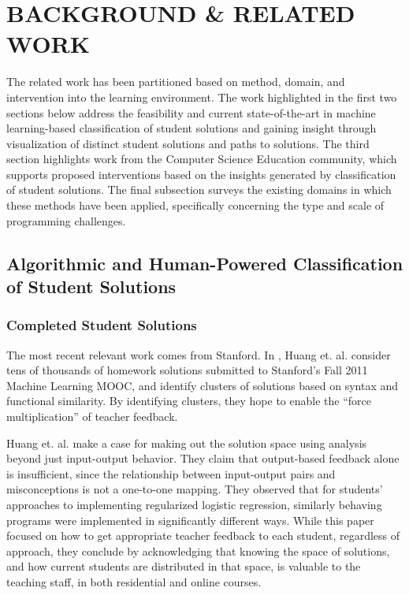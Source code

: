 \documentclass[12pt]{article}
\begin{document}
\section{BACKGROUND \& RELATED WORK}

The related work has been partitioned based on method, domain, and intervention into the learning environment. The work highlighted in the first two sections below address the feasibility and current state-of-the-art in machine learning-based classification of student solutions and gaining insight through visualization of distinct student solutions and paths to solutions. The third section highlights work from the Computer Science Education community, which supports proposed interventions based on the insights generated by classification of student solutions. The final subsection surveys the existing domains in which these methods have been applied, specifically concerning the type and scale of programming challenges.

\subsection{Algorithmic and Human-Powered Classification of Student Solutions}
\subsubsection{Completed Student Solutions}

The most recent relevant work comes from Stanford. In \cite{MOOCshop}, Huang et. al. consider tens of thousands of homework solutions submitted to Stanford’s Fall 2011 Machine Learning MOOC, and identify clusters of solutions based on syntax and functional similarity. By identifying clusters, they hope to enable the ``force multiplication'' of teacher feedback. 

Huang et. al. \cite{MOOCshop} make a case for making out the solution space using analysis beyond just input-output behavior. They claim that output-based feedback alone is insufficient, since the relationship between input-output pairs and misconceptions is not a one-to-one mapping.  They observed that for students' approaches to implementing regularized logistic regression, similarly behaving programs were implemented in significantly different ways. While this paper focused on how to get appropriate teacher feedback to each student, regardless of approach, they conclude by acknowledging that knowing the space of solutions, and how current students are distributed in that space, is valuable to the teaching staff, in both residential and online courses. 
\end{document}
